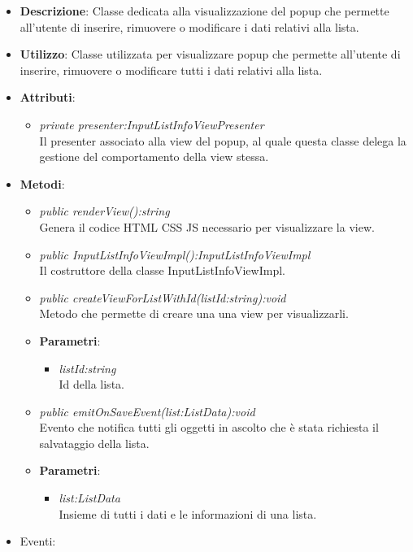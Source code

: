 \begin{itemize}
\item \textbf{Descrizione}: Classe dedicata alla visualizzazione del popup che permette all'utente di inserire, rimuovere o modificare i dati relativi alla lista.
\item \textbf{Utilizzo}: Classe utilizzata per visualizzare popup che permette all'utente di inserire, rimuovere o modificare tutti i dati relativi alla lista.
\item \textbf{Attributi}: 
	\begin{itemize}
	\item \textit{private presenter:InputListInfoViewPresenter}\\
		Il presenter associato alla view del popup, al quale questa classe delega la gestione del comportamento della view stessa.
	\end{itemize}
\item \textbf{Metodi}:
	\begin{itemize}	
	\item \textit{public renderView():string}\\
			Genera il codice HTML CSS JS necessario per visualizzare la view.
	\item \textit{public InputListInfoViewImpl():InputListInfoViewImpl}\\
	Il costruttore della classe InputListInfoViewImpl.
	\item \textit{public createViewForListWithId(listId:string):void}\\
		Metodo che permette di creare una una view per visualizzarli.
			\item{\textbf{Parametri}: \begin{itemize}
			\item \textit{listId:string}\\
			Id della lista.
			\end{itemize}}
	\item \textit{public emitOnSaveEvent(list:ListData):void}\\
	Evento che notifica tutti gli oggetti in ascolto che è stata richiesta il salvataggio della lista.
			\item{\textbf{Parametri}: \begin{itemize}
			\item \textit{list:ListData}\\
				Insieme di tutti i dati e le informazioni di una lista.
			\end{itemize}}
	\end{itemize}
\item{Eventi}:
\end{itemize}

